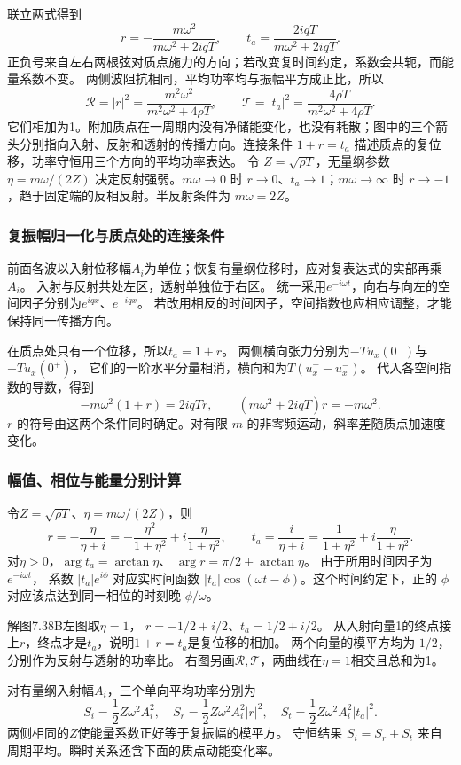 \documentclass[UTF8,fontset=fandol,a4paper,11pt]{ctexart}
\begin{document}
联立两式得到
\[\boxed{r=-\frac{m\omega^2}{m\omega^2+2iqT},\qquad
 t_a=\frac{2iqT}{m\omega^2+2iqT}.}\]
正负号来自左右两根弦对质点施力的方向；若改变复时间约定，系数会共轭，而能量系数不变。
两侧波阻抗相同，平均功率均与振幅平方成正比，所以
\[\boxed{\mathcal R=|r|^2=\frac{m^2\omega^2}{m^2\omega^2+4\rho T},\qquad
\mathcal T=|t_a|^2=\frac{4\rho T}{m^2\omega^2+4\rho T}.}\]
它们相加为1。附加质点在一周期内没有净储能变化，也没有耗散；图中的三个箭头分别指向入射、反射和透射的传播方向。连接条件 $1+r=t_a$ 描述质点的复位移，功率守恒用三个方向的平均功率表达。
令 $Z=\sqrt{\rho T}$，无量纲参数 $\eta=m\omega/(2Z)$ 决定反射强弱。$m\omega\to0$ 时 $r\to0$、$t_a\to1$；$m\omega\to\infty$ 时 $r\to-1$，趋于固定端的反相反射。半反射条件为 $m\omega=2Z$。
\subsubsection*{复振幅归一化与质点处的连接条件}
前面各波以入射位移幅$A_i$为单位；恢复有量纲位移时，应对复表达式的实部再乘$A_i$。
入射与反射共处左区，透射单独位于右区。
统一采用$e^{-i\omega t}$，向右与向左的空间因子分别为$e^{iqx}$、$e^{-iqx}$。
若改用相反的时间因子，空间指数也应相应调整，才能保持同一传播方向。

在质点处只有一个位移，所以$t_a=1+r$。
两侧横向张力分别为$-Tu_x(0^-)$与$+Tu_x(0^+)$，
它们的一阶水平分量相消，横向和为$T(u_x^+-u_x^-)$。
代入各空间指数的导数，得到
\[
-m\omega^2(1+r)=2iqTr,\qquad
(m\omega^2+2iqT)r=-m\omega^2.
\]
$r$ 的符号由这两个条件同时确定。对有限 $m$ 的非零频运动，斜率差随质点加速度变化。

\subsubsection*{幅值、相位与能量分别计算}
令$Z=\sqrt{\rho T}$、$\eta=m\omega/(2Z)$，则
\[
r=-\frac\eta{\eta+i}
=-\frac{\eta^2}{1+\eta^2}+i\frac\eta{1+\eta^2},\qquad
t_a=\frac i{\eta+i}
=\frac1{1+\eta^2}+i\frac\eta{1+\eta^2}.
\]
对$\eta>0$，$\arg t_a=\arctan\eta$、
$\arg r=\pi/2+\arctan\eta$。
由于所用时间因子为$e^{-i\omega t}$，
系数 $|t_a|e^{i\phi}$ 对应实时间函数 $|t_a|\cos(\omega t-\phi)$。这个时间约定下，正的 $\phi$ 对应该点达到同一相位的时刻晚 $\phi/\omega$。

解图7.38B左图取$\eta=1$，
$r=-1/2+i/2$、$t_a=1/2+i/2$。
从入射向量1的终点接上$r$，终点才是$t_a$，说明$1+r=t_a$是复位移的相加。
两个向量的模平方均为 $1/2$，分别作为反射与透射的功率比。
右图另画$\mathcal R,\mathcal T$，两曲线在$\eta=1$相交且总和为1。

对有量纲入射幅$A_i$，三个单向平均功率分别为
\[
S_i=\frac12Z\omega^2A_i^2,\quad
S_r=\frac12Z\omega^2A_i^2|r|^2,\quad
S_t=\frac12Z\omega^2A_i^2|t_a|^2.
\]
两侧相同的$Z$使能量系数正好等于复振幅的模平方。
守恒结果 $S_i=S_r+S_t$ 来自周期平均。瞬时关系还含下面的质点动能变化率。
\end{document}
